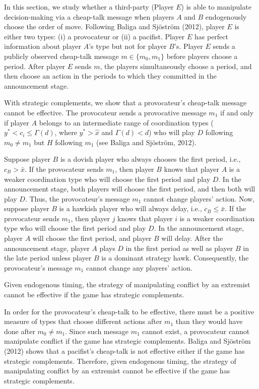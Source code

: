 \documentclass[12pt,english]{article}
\begin{document}
In this section, we study whether a third-party (Player $E$) is able to manipulate decision-making via a cheap-talk message when players $A$ and $B$ endogenously choose the order of move. Following Baliga and Sj\"ostr\"om (2012), player $E$ is either two types: (i) a provocateur or (ii) a pacifist. Player $E$ has perfect information about player $A$'s type but not for player $B$'s. Player $E$ sends a publicly observed cheap-talk message $m \in \{m_0, m_1\}$ before players choose a period. After player $E$ sends $m$, the players simultaneously choose a period, and then choose an action in the periods to which they committed in the announcement stage.\par 
With strategic complements, we show that a provocateur's cheap-talk message cannot be effective. The provocateur sends a provocative message $m_1$ if and only if player $A$ belongs to an intermediate range of coordination types ($y^*<c_i\leq \Gamma(d)$, where $y^*>\hat{x}$ and $\Gamma(d)<d$) who will play $D$ following $m_0 \neq m_1$ but $H$ following $m_1$ (see Baliga and Sj\"ostr\"om, 2012). \par
Suppose player $B$ is a dovish player who always chooses the first period, i.e., $c_B>\bar{x}$. If the provocateur sends $m_1$, then player $B$ knows that player $A$ is a weaker coordination type who will choose the first period and play $D$. In the announcement stage, both players will choose the first period, and then both will play $D$. Thus, the provocateur's message $m_1$ cannot change players' action. Now, suppose player $B$ is a hawkish player who will always delay, i.e., $c_B \leq \bar{x}$. If the provocateur sends $m_1$, then player $j$ knows that player $i$ is a weaker coordination type who will choose the first period and play $D$. In the announcement stage, player $A$ will choose the first period, and player $B$ will delay. After the announcement stage, player $A$ plays $D$ in the first period as well as player $B$ in the late period unless player $B$ is a dominant strategy hawk. Consequently, the provocateur's message $m_1$ cannot change any players' action. 
\begin{prop}
Given endogenous timing, the strategy of manipulating conflict by an extremist cannot be effective if the game has strategic complements.
\end{prop}\par
In order for the provocateur's cheap-talk to be effective, there must be a positive measure of types that choose different actions after $m_1$ than they would have done after $m_0\neq m_1$. Since such message $m_1$ cannot exist, a provocateur cannot manipulate conflict if the game has strategic complements. Baliga and Sj\"ostr\"om (2012) shows that a pacifist's cheap-talk is not effective either if the game has strategic complements. Therefore, given endogenous timing, the strategy of manipulating conflict by an extremist cannot be effective if the game has strategic complements. \par  
\end{document}
